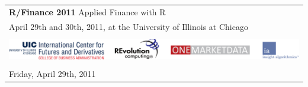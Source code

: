 \documentclass[11pt]{article}
\newcommand{\ra}[1]{\renewcommand{\arraystretch}{#1}}  %
\begin{document}
\thispagestyle{empty}


\ra{1.05} \sf

\begin{tabular}{rlrlp{5in}} %

  \multicolumn{5}{l}{\Huge \textbf{\color{KeynoteTalk} R/Finance 2011} \huge \phantom{i} Applied Finance with R} \\
  \multicolumn{5}{l}{\large \color{Breaks} April 29th and 30th, 2011, at the University of Illinois at Chicago} \\[3pt]

  \bottomrule \\

  \multicolumn{5}{l}{
    \centering
    \includegraphics[page=1,scale=0.15]{alllogos.pdf}
  } \\[5pt]

  \bottomrule \\[3pt]

  \multicolumn{5}{l}{\large Friday, April 29th, 2011} \\


\end{tabular}
\end{document}
